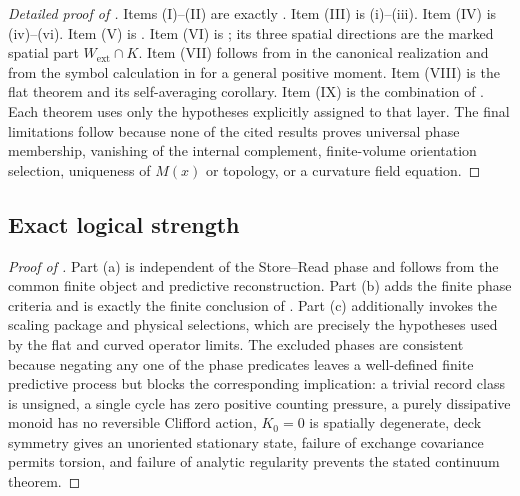 \documentclass[11pt]{article}
\theoremstyle{definition}
\theoremstyle{remark}
\newcommand{\ext}{\mathrm{ext}}
\begin{document}
\begin{proof}[Detailed proof of ]
Items \textup{(I)}--\textup{(II)} are exactly
.  Item \textup{(III)} is
\textup{(i)--(iii)}.  Item \textup{(IV)} is
\textup{(iv)--(vi)}.  Item \textup{(V)} is
.  Item \textup{(VI)} is
; its three spatial directions are the marked spatial
part $W_{\ext}\cap K$.  Item \textup{(VII)} follows from
 in the canonical realization and from the symbol
calculation in  for a general positive moment.  Item
\textup{(VIII)} is the flat theorem and its self-averaging corollary.  Item
\textup{(IX)} is the combination of
.  Each theorem uses only the
hypotheses explicitly assigned to that layer.  The final limitations follow
because none of the cited results proves universal phase membership, vanishing
of the internal complement, finite-volume orientation selection, uniqueness of
$M(x)$ or topology, or a curvature field equation.
\end{proof}

\subsection{Exact logical strength}
\label{app:proof-logical-strength}

\begin{proof}[Proof of ]
Part \textup{(a)} is independent of the Store--Read phase and follows from the
common finite object and predictive reconstruction.  Part \textup{(b)} adds the
finite phase criteria and is exactly the finite conclusion of
.  Part
\textup{(c)} additionally invokes the scaling package and physical selections,
which are precisely the hypotheses used by the flat and curved operator
limits.  The excluded phases are consistent because negating any one of the
phase predicates leaves a well-defined finite predictive process but blocks the
corresponding implication: a trivial record class is unsigned, a single cycle
has zero positive counting pressure, a purely dissipative monoid has no
reversible Clifford action, $K_0=0$ is spatially degenerate, deck symmetry gives
an unoriented stationary state, failure of exchange covariance permits torsion,
and failure of analytic regularity prevents the stated continuum theorem.
\end{proof}
\end{document}
